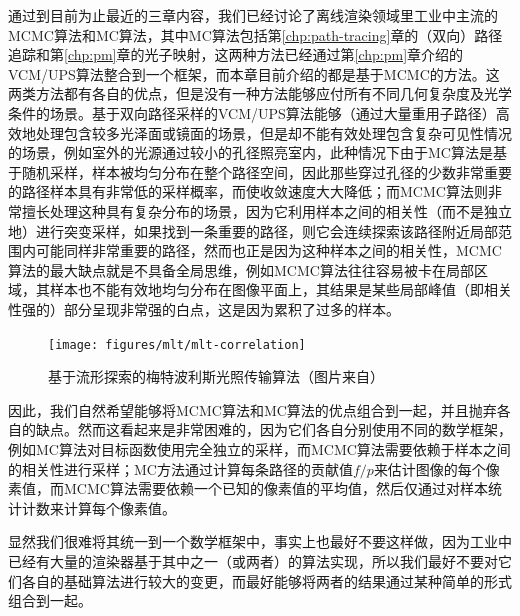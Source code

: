 通过到目前为止最近的三章内容，我们已经讨论了离线渲染领域里工业中主流的MCMC算法和MC算法，其中MC算法包括第\ref{chp:path-tracing}章的（双向）路径追踪和第\ref{chp:pm}章的光子映射，这两种方法已经通过第\ref{chp:pm}章介绍的VCM/UPS算法整合到一个框架，而本章目前介绍的都是基于MCMC的方法。这两类方法都有各自的优点，但是没有一种方法能够应付所有不同几何复杂度及光学条件的场景。基于双向路径采样的VCM/UPS算法能够（通过大量重用子路径）高效地处理包含较多光泽面或镜面的场景，但是却不能有效处理包含复杂可见性情况的场景，例如室外的光源通过较小的孔径照亮室内，此种情况下由于MC算法是基于随机采样，样本被均匀分布在整个路径空间，因此那些穿过孔径的少数非常重要的路径样本具有非常低的采样概率，而使收敛速度大大降低；而MCMC算法则非常擅长处理这种具有复杂分布的场景，因为它利用样本之间的相关性（而不是独立地）进行突变采样，如果找到一条重要的路径，则它会连续探索该路径附近局部范围内可能同样非常重要的路径，然而也正是因为这种样本之间的相关性，MCMC算法的最大缺点就是不具备全局思维，例如MCMC算法往往容易被卡在局部区域，其样本也不能有效地均匀分布在图像平面上，其结果是某些局部峰值（即相关性强的）部分呈现非常强的白点，这是因为累积了过多的样本。

\begin{figure}
	\texttt{[image: figures/mlt/mlt-correlation]}
	\caption{基于流形探索的梅特波利斯光照传输算法（图片来自\cite{a:ManifoldExplorationAMarkovChainMonteCarloTechniqueforRenderingSceneswithDifficultSpecularTransport}）}
	\label{f:mlt-mlt-correlation}
\end{figure}


因此，我们自然希望能够将MCMC算法和MC算法的优点组合到一起，并且抛弃各自的缺点。然而这看起来是非常困难的，因为它们各自分别使用不同的数学框架，例如MC算法对目标函数使用完全独立的采样，而MCMC算法需要依赖于样本之间的相关性进行采样；MC方法通过计算每条路径的贡献值$f/p$来估计图像的每个像素值，而MCMC算法需要依赖一个已知的像素值的平均值，然后仅通过对样本统计计数来计算每个像素值。

显然我们很难将其统一到一个数学框架中，事实上也最好不要这样做，因为工业中已经有大量的渲染器基于其中之一（或两者）的算法实现，所以我们最好不要对它们各自的基础算法进行较大的变更，而最好能够将两者的结果通过某种简单的形式组合到一起。


